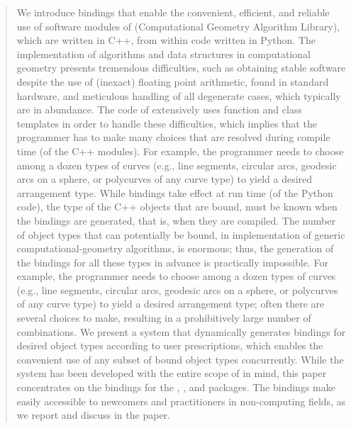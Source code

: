\begin{abstract}
We introduce bindings that enable the convenient, efficient, and reliable use of software modules of \cgal{} (Computational Geometry Algorithm Library), which are written in C++, from within code written in Python.
The implementation of algorithms and data structures in computational geometry presents tremendous difficulties, such as obtaining stable software despite the use of (inexact) floating point arithmetic, found in standard hardware, and meticulous handling of all degenerate cases, which typically are in abundance. The code of \cgal{} extensively uses function and class templates in order to handle these difficulties, which implies that the programmer has to make many choices that are resolved during compile time (of the C++ modules). For example, the programmer needs to choose among a dozen types of curves (e.g., line segments, circular arcs, geodesic arcs on a sphere, or polycurves of any curve type) to yield a desired arrangement type. While bindings take effect at run time (of the Python code), the type of the C++ objects that are bound, must be known when the bindings are generated, that is, when they are compiled.
The number of object types that can potentially be bound, in implementation of generic computational-geometry algorithms, is enormous; thus, the generation of the bindings for all these types in advance is practically impossible. For example, the programmer needs to choose among a dozen types of curves (e.g., line segments, circular arcs, geodesic arcs on a sphere, or polycurves of any curve type) to yield a desired arrangement type; often there are several choices to make, resulting in a prohibitively large number of combinations. We present a system that dynamically generates bindings for desired object types according to user prescriptions, which enables the convenient use of any subset of bound object types concurrently.
While the system has been developed with the entire scope of \cgal{} in mind, this paper concentrates on the bindings for the \cgal{} \iiDArrangementsPackage{}, \iiDRegularizedBooleanSetOperationsPackage{}, and \iiDMinkowskiSumsPackage{} packages.
The bindings make \cgal{} easily accessible to newcomers and practitioners in non-computing fields, as we report and discuss in the paper.
\end{abstract}
